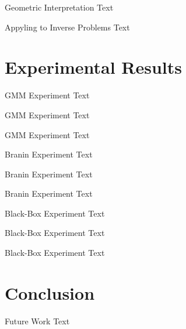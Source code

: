 \documentclass{beamer}
\begin{document}
    \begin{frame}{Geometric Interpretation}
        Text
    \end{frame}

    \begin{frame}{Appyling to Inverse Problems}
        Text
    \end{frame}

    \section{Experimental Results}

    \begin{frame}{GMM Experiment}
        Text
    \end{frame}

    \begin{frame}{GMM Experiment}
        Text
    \end{frame}

    \begin{frame}{GMM Experiment}
        Text
    \end{frame}

    \begin{frame}{Branin Experiment}
        Text
    \end{frame}

    \begin{frame}{Branin Experiment}
        Text
    \end{frame}

    \begin{frame}{Branin Experiment}
        Text
    \end{frame}

    \begin{frame}{Black-Box Experiment}
        Text
    \end{frame}

    \begin{frame}{Black-Box Experiment}
        Text
    \end{frame}

    \begin{frame}{Black-Box Experiment}
        Text
    \end{frame}

    \section{Conclusion}

    \begin{frame}{Future Work}
        Text
    \end{frame}
\end{document}
